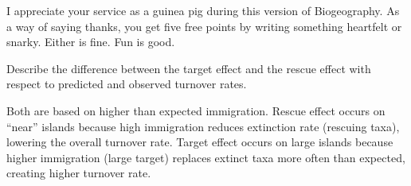 \question[5]
I appreciate your service as a guinea pig during this version of Biogeography.  As a way of saying thanks, you get five free points by writing something heartfelt or snarky. Either is fine. Fun is good.  

\vspace{2in}


\question[5]
Describe the difference between the target effect and the rescue effect with respect to predicted and observed turnover rates.

\begin{solution}
	Both are based on higher than expected immigration. Rescue effect occurs on ``near'' islands because high immigration reduces extinction rate (rescuing taxa), lowering the overall turnover rate. Target effect occurs on large islands because higher immigration (large target) replaces extinct taxa more often than expected, creating higher turnover rate.
\end{solution}


